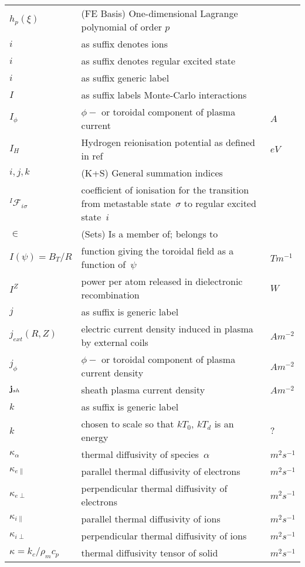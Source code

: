 \begin{longtable}{|p{3.0cm}|p{10.0cm}|p{3.0cm}|}
$h_p(\xi)$ &  (FE Basis) One-dimensional Lagrange polynomial of order $p$ & \\
$i$ & as suffix denotes ions & \\
$i$ & as suffix denotes regular excited state & \\
$i$ & as suffix generic label & \\
$I$ & as suffix labels Monte-Carlo interactions & \\
$I_\phi$ & $\phi-$ or toroidal component of plasma current & $A$ \\
$I_H$ & Hydrogen reionisation potential as defined in ref~\cite{Ha13Benc} & $eV$ \\
$i,j,k$ &  (K+S) General summation indices & \\
$^I\mathcal{F}_{i\sigma}$ & coefficient of ionisation for the transition from metastable state~$\sigma$ to regular excited state~$i$ & \\
$\in$ &  (Sets) Is a member of; belongs to & \\
$I(\psi)=B_T/R$ & function giving the toroidal field as a function of~$\psi$  & $T m^{-1}$ \\
$I^Z$ & power per atom released in dielectronic recombination  & $W$ \\
$j$ & as suffix is generic label & \\
$j_{ext}(R,Z)$ & electric current density induced in plasma by external coils  & $A m^{-2}$ \\
$j_\phi$ & $\phi-$ or toroidal component of plasma current density  & $A m^{-2}$ \\
${\bf j}_{sh}$ & sheath plasma current density  & $A m^{-2}$ \\
$k$ & as suffix is generic label & \\
$k$ & chosen to scale so that $kT_0$, $kT_d$ is an energy & $?$ \\
$\kappa_\alpha$ & thermal diffusivity of species~$\alpha$ & $m^2 s^{-1}$ \\
$\kappa_{e\|}$ & parallel thermal diffusivity of electrons & $m^2 s^{-1}$ \\
$\kappa_{e\perp}$ & perpendicular thermal diffusivity of electrons & $m^2 s^{-1}$ \\
$\kappa_{i\|}$ & parallel thermal diffusivity of ions & $m^2 s^{-1}$ \\
$\kappa_{i\perp}$ & perpendicular thermal diffusivity of ions & $m^2 s^{-1}$ \\
$\kappa=k_c/\rho_m c_p$ & thermal diffusivity tensor of solid & $m^2 s^{-1}$ \\

\end{longtable}
